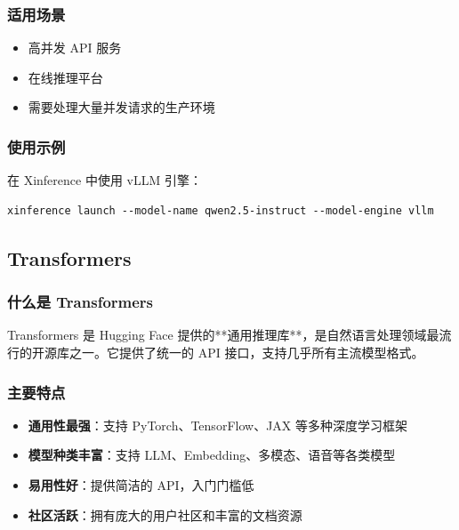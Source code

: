 \documentclass[12pt,UTF8]{ctexbook}
\begin{document}
\subsubsection{适用场景}

\begin{itemize}[leftmargin=2cm]
    \item 高并发 API 服务
    \item 在线推理平台
    \item 需要处理大量并发请求的生产环境
\end{itemize}

\subsubsection{使用示例}

在 Xinference 中使用 vLLM 引擎：

\begin{lstlisting}
xinference launch --model-name qwen2.5-instruct --model-engine vllm
\end{lstlisting}

\subsection{Transformers}
\label{subsec:transformers}

\subsubsection{什么是 Transformers}

Transformers 是 Hugging Face 提供的**通用推理库**，是自然语言处理领域最流行的开源库之一。它提供了统一的 API 接口，支持几乎所有主流模型格式。

\subsubsection{主要特点}

\begin{itemize}[leftmargin=2cm]
    \item \textbf{通用性最强}：支持 PyTorch、TensorFlow、JAX 等多种深度学习框架
    \item \textbf{模型种类丰富}：支持 LLM、Embedding、多模态、语音等各类模型
    \item \textbf{易用性好}：提供简洁的 API，入门门槛低
    \item \textbf{社区活跃}：拥有庞大的用户社区和丰富的文档资源
\end{itemize}
\end{document}
